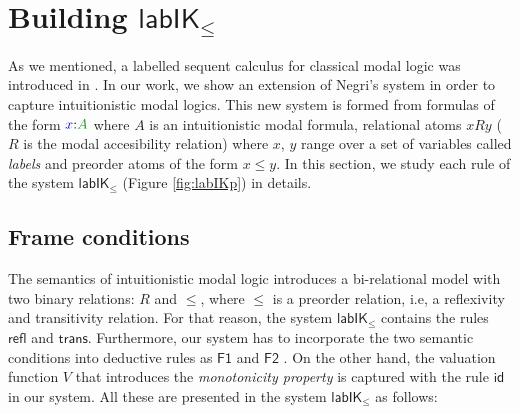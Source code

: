 \documentclass[a4paper]{article}
\theoremstyle{plain}
\theoremstyle{definition}
\newcommand*{\lab}{\mathsf{lab}}
\newcommand*{\IK}{\mathsf{IK}}
\newcommand*{\labIKp}{\lab\IK_{\le}}
\newcommand*{\fm}[1]{{\color{notgreen}{#1}}}
\newcommand*{\lb}[1]{{\color{blue}{#1}}}
\newcommand*{\labels}[2]{\lb{#1}\mathord{:}\fm{#2}}
\newcommand*{\rn}[1]  {\ensuremath{\mathsf{#1}}}
\begin{document}
\section{Building $\labIKp$}

As we mentioned, a labelled sequent calculus for classical modal logic was introduced in \cite{Negri}. In our work, we show an extension of Negri's system in order to capture intuitionistic modal logics. This new system is formed from formulas of the form $\labels{x}{A}$ where $A$ is an intuitionistic modal formula, relational atoms $xRy$ ($R$ is the modal accesibility relation) where $x$, $y$ range over a set of variables called \emph{labels} and preorder atoms of the form $x \le y$. In this section, we study each rule of the system $\labIKp$ (Figure \ref{fig:labIKp}) in details. 

\subsection{Frame conditions}
The semantics of intuitionistic modal logic introduces a bi-relational model with two binary relations: $R$ and $\le$, where $\le$ is a preorder relation, i.e, a reflexivity and transitivity relation. For that reason, the system $\labIKp$ contains the rules $\rn{refl}$ and $\rn{trans}$. Furthermore, our system has to incorporate the two semantic conditions into deductive rules as $\rn{F1}$ and $\rn{F2}$ . On the other hand, the valuation function $V$ that introduces the \emph{monotonicity property} is captured with the rule $\rn{id}$ in our system. All these are presented in the system $\labIKp$ as follows:
\end{document}
